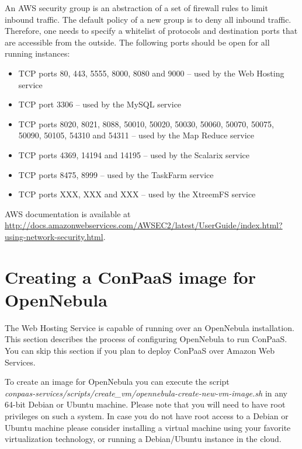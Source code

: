 \documentclass[10pt]{article}
\begin{document}
An AWS security group is an abstraction of a set of firewall rules to
limit inbound traffic. The default policy of a new group is to deny
all inbound traffic. Therefore, one needs to specify a whitelist of
protocols and destination ports that are accessible from the outside. 
The following ports should be open for all running instances: 
\begin{itemize}
\item TCP ports 80, 443, 5555, 8000, 8080 and 9000 -- used by the Web Hosting service
\item TCP port 3306 -- used by the MySQL service
\item TCP ports 8020, 8021, 8088, 50010, 50020, 50030, 50060, 50070, 50075, 50090, 50105, 54310 and 54311 -- used by the Map Reduce service
\item TCP ports 4369, 14194 and 14195 -- used by the Scalarix service
\item TCP ports 8475, 8999 -- used by the TaskFarm service
\item TCP ports XXX, XXX and XXX -- used by the XtreemFS service
\end{itemize}

AWS documentation is available at
\url{http://docs.amazonwebservices.com/AWSEC2/latest/UserGuide/index.html?using-network-security.html}.

\section{Creating a ConPaaS image for OpenNebula}
\label{sec:oneimage}

The Web Hosting Service is capable of running over an OpenNebula
installation. This section describes the process of configuring
OpenNebula to run ConPaaS. You can skip this section if you plan to
deploy ConPaaS over Amazon Web Services.

To create an image for OpenNebula you can execute the script\\
\textit{conpaas-services/scripts/create\_vm/opennebula-create-new-vm-image.sh}
in any 64-bit Debian or Ubuntu machine. Please note that you will need to have
root privileges on such a system. In case you do not have root access to a
Debian or Ubuntu machine please consider installing a virtual machine using
your favorite virtualization technology, or running a Debian/Ubuntu instance in
the cloud.
\end{document}
